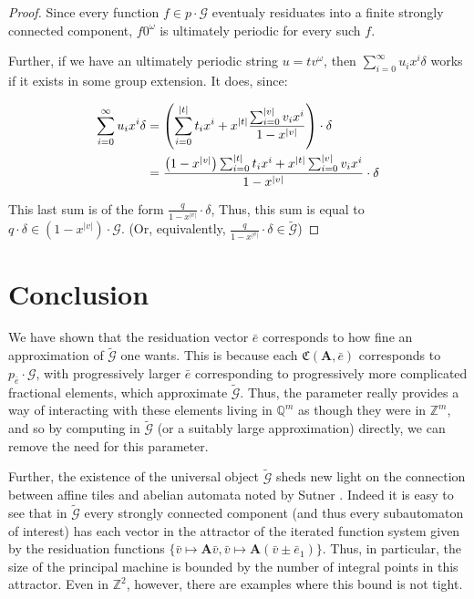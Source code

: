 \documentclass{article}
\newcommand{\G}{\mathcal{G}}
\newcommand{\C}{\mathfrak{C}(\Am,\e)}
\newcommand{\Z}{\mathbb{Z}}
\newcommand{\Q}{\mathbb{Q}}
\newcommand{\2}{\textbf{2}}
\newcommand{\Am}{\textbf{A}}
\newcommand{\vv}{\bar{v}}
\newcommand{\e}{\bar{e}}
\theoremstyle{definition}
\begin{document}
\begin{proof}
  Since every function $f \in p \cdot \G$ eventualy residuates into a finite
  strongly connected component, $f 0^\omega$ is ultimately periodic for
  every such $f$.

  Further, if we have an ultimately periodic string $u = tv^{\omega}$, then
  $\sum_{i=0}^{\infty} u_i x^i \delta$ works if it exists in some group 
  extension. It does, since:

  \begin{align*}
    \sum_{i=0}^{\infty} u_i x^i \delta 
    &= \left ( 
        \sum_{i=0}^{|t|} t_i x^i
        + x^{|t|} \frac{\sum_{i=0}^{|v|} v_i x^i}{1 - x^{|v|}}
       \right ) \cdot \delta\\
    &= \frac%
        {%
          \left ( 1 - x^{|v|} \right ) \sum_{i=0}^{|t|} t_i x^i + 
          x^{|t|} \sum_{i=0}^{|v|} v_i x^i
        }
        {1 - x^{|v|}}
       \cdot \delta\\
  \end{align*}

  This last sum is of the form $\frac{q}{1 - x^{|v|}} \cdot \delta$, 
  Thus, this sum is equal to $q \cdot \delta \in (1 - x^{|v|}) \cdot \G$.
  (Or, equivalently, $\frac{q}{1 - x^{|v|}} \cdot \delta \in \widetilde{\G}$)
\end{proof}

\newpage
\section{Conclusion}
We have shown that the residuation vector $\e$ corresponds to how fine an
approximation of $\widetilde{\G}$ one wants. This is because each $\C$ 
corresponds to $p_{\e} \cdot \G$, with progressively larger $\e$ 
corresponding to progressively more complicated fractional elements, which
approximate $\widetilde{\G}$. Thus, the parameter really provides a way of
interacting with these elements living in $\Q^m$ as though they were in $\Z^m$,
and so by computing in $\widetilde{\G}$ (or a suitably large approximation) 
directly, we can remove the need for this parameter.

Further, the existence of the universal object $\widetilde{\G}$ 
sheds new light on the connection between affine tiles
\cite{LagariasWang96:tiles,LagariasWang97:integral_tiles}
and abelian automata noted by Sutner
\cite{Sutner18:abelian_automata}. 
Indeed it is easy to see that in 
$\widetilde{\G}$ every strongly connected component 
(and thus every subautomaton of interest) has each vector in the attractor 
of the iterated function system given by the residuation functions 
$\{ \vv \mapsto \Am \vv, \vv \mapsto \Am (\vv \pm \e_1) \}$.
Thus, in particular, the size of the principal machine is bounded by the
number of integral points in this attractor. Even in $\Z^2$, however, there
are examples where this bound is not tight.
\end{document}
